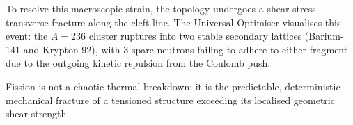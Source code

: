To resolve this macroscopic strain, the topology undergoes a shear-stress transverse fracture along the cleft line. The Universal Optimiser visualises this event: the $A=236$ cluster ruptures into two stable secondary lattices (Barium-141 and Krypton-92), with 3 spare neutrons failing to adhere to either fragment due to the outgoing kinetic repulsion from the Coulomb push.

Fission is not a chaotic thermal breakdown; it is the predictable, deterministic mechanical fracture of a tensioned structure exceeding its localised geometric shear strength.
